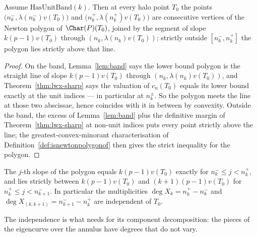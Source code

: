 \begin{theorem}
  \label{thm:lwx13-vertices}
  \leanok
  Assume $\mathrm{HasUnitBand}(k)$.  Then at every halo point $T_0$ the points
  $\bigl(n_k^{-}, \lambda(n_k^{-})v(T_0)\bigr)$ and $\bigl(n_k^{+}, \lambda(n_k^{+})v(T_0)\bigr)$
  are consecutive vertices of the Newton polygon of $\Char(P)(T_0)$, joined by the segment of
  slope $k(p-1)v(T_0)$ through $(n_k,\lambda(n_k)v(T_0))$; strictly outside $[n_k^-, n_k^+]$ the
  polygon lies strictly above that line.
\end{theorem}

\begin{proof}
  \leanok
  On the band, Lemma~\ref{lem:band} says the lower bound polygon is the straight line of slope
  $k(p-1)v(T_0)$ through $(n_k, \lambda(n_k)v(T_0))$, and Theorem~\ref{thm:lwx-sharp} says the
  valuation of $c_n(T_0)$ equals its lower bound exactly at the unit indices --- in particular at
  $n_k^{\pm}$.  So the polygon meets the line at those two abscissae, hence coincides with it in
  between by convexity.  Outside the band, the excess of Lemma~\ref{lem:band} plus the definitive
  margin of Theorem~\ref{thm:lwx-sharp} at non-unit indices puts every point strictly above the
  line; the greatest-convex-minorant characterisation of
  Definition~\ref{def:isnewtonpolygonof} then gives the strict inequality for the polygon.
\end{proof}

\begin{corollary}
  \label{cor:lwx13-slopes}
  \leanok
  The $j$-th slope of the polygon equals $k(p-1)v(T_0)$ exactly for
  $n_k^{-}\leq j < n_k^{+}$, and lies strictly between $k(p-1)v(T_0)$ and $(k+1)(p-1)v(T_0)$ for
  $n_k^{+}\leq j < n_{k+1}^{-}$.  In particular the multiplicities
  $\deg X_k = n_k^{+}-n_k^{-}$ and $\deg X_{(k,k+1)} = n_{k+1}^{-}-n_k^{+}$ are independent of
  $T_0$.
\end{corollary}

The independence is what \cite[Theorem 1.3]{LWX} needs for its component decomposition: the
pieces of the eigencurve over the annulus have degrees that do not vary.

